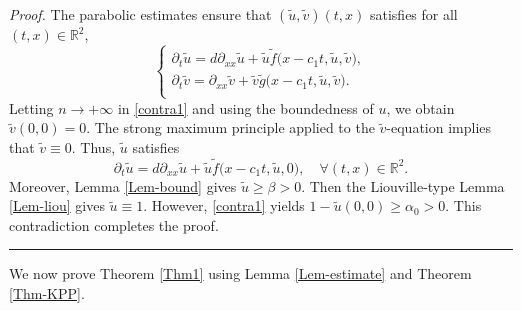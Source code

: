 \documentclass[10pt]{article}
\numberwithin{equation}{section}
\newcommand{\R}{\mathbb{R}}
\newenvironment{proof}[1][Proof]{\noindent\textit{#1.} }{\hfill \rule{0.5em}{0.5em}}
\begin{document}
\begin{proof}
The parabolic estimates ensure that    $(\tilde{u}, \tilde{v}) (t,x)$  satisfies  for all $(t,x) \in \R^2$,
\begin{equation*}
\begin{cases}
\partial_t \tilde{u}= d \partial_{xx} \tilde{u}  +  \tilde{u}  \tilde{f} \big( x-c_1t, \tilde{u}, \tilde{v} \big),\\
\partial_t \tilde{v}=  \partial_{xx} \tilde{v} + \tilde{v} \tilde{g} \big( x-c_1t, \tilde{u}, \tilde{v} \big).  \\
\end{cases}
\end{equation*}
Letting $n \to +\infty $ in  \eqref{contra1} and using the boundedness of $u$,  we  obtain
$\tilde{v}(0, 0) = 0$. The  strong maximum principle   applied to  the $\tilde{v}$-equation  implies that $\tilde{v}\equiv 0$.  Thus, $\tilde{u}$ satisfies 
\begin{equation*}
\partial_t \tilde{u}= d \partial_{xx} \tilde{u}  + \tilde{u} \tilde{f} \big( x-c_1t, \tilde{u}, 0 \big) ,     \quad \forall (t,x ) \in \R^2.
\end{equation*}
Moreover,  Lemma \ref{Lem-bound} gives $\tilde{u} \geq \beta >0$.   
Then  the Liouville-type  Lemma \ref{Lem-liou}  gives  $\tilde{u} \equiv 1$.     However, \eqref{contra1} yields 
$1- \tilde{u}(0, 0) \geq \alpha_0 >0$.
This contradiction completes  the proof. 


\end{proof}




We now prove Theorem \ref{Thm1}  using  Lemma \ref{Lem-estimate} and Theorem \ref{Thm-KPP}.
\end{document}

